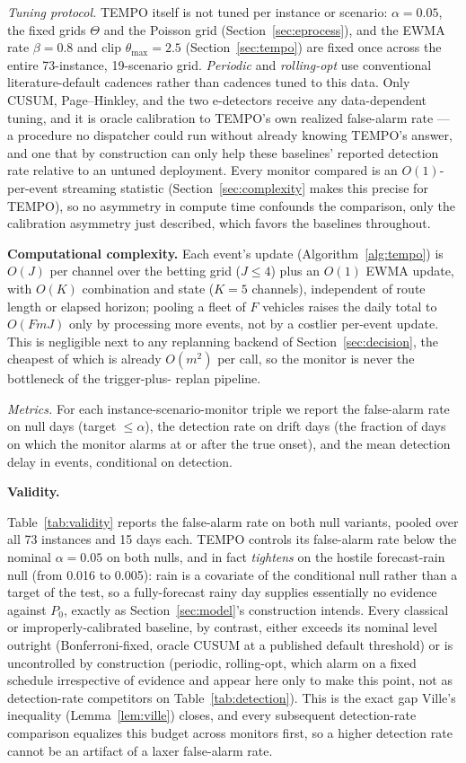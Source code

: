 \documentclass[trsc,dblanonrev]{informs4}
\begin{document}
\emph{Tuning protocol.} TEMPO itself is not tuned per instance or
scenario: $\alpha = 0.05$, the fixed grids $\Theta$ and the Poisson
grid (Section~\ref{sec:eprocess}), and the EWMA rate $\beta = 0.8$ and
clip $\theta_{\max} = 2.5$ (Section~\ref{sec:tempo}) are fixed once
across the entire 73-instance, 19-scenario grid. \emph{Periodic} and
\emph{rolling-opt} use conventional literature-default cadences rather
than cadences tuned to this data. Only CUSUM, Page--Hinkley, and the
two e-detectors receive any data-dependent tuning, and it is oracle
calibration to TEMPO's own realized false-alarm rate --- a procedure no
dispatcher could run without already knowing TEMPO's answer, and one
that by construction can only help these baselines' reported detection
rate relative to an untuned deployment. Every monitor compared is an
$O(1)$-per-event streaming statistic (Section~\ref{sec:complexity}
makes this precise for TEMPO), so no asymmetry in compute time
confounds the comparison, only the calibration asymmetry just
described, which favors the baselines throughout.

\textbf{Computational complexity.}\label{sec:complexity} Each event's
update (Algorithm~\ref{alg:tempo}) is $O(J)$ per channel over the
betting grid ($J \le 4$) plus an $O(1)$ EWMA update, with $O(K)$
combination and state ($K=5$ channels), independent of route length or
elapsed horizon; pooling a fleet of $F$ vehicles raises the daily total
to $O(FmJ)$ only by processing more events, not by a costlier
per-event update. This is negligible next to any replanning backend of
Section~\ref{sec:decision}, the cheapest of which is already $O(m^2)$
per call, so the monitor is never the bottleneck of the trigger-plus-
replan pipeline.

\emph{Metrics.} For each instance-scenario-monitor triple we report the
false-alarm rate on null days (target $\le \alpha$), the detection
rate on drift days (the fraction of days on which the monitor alarms
at or after the true onset), and the mean detection delay in events,
conditional on detection.

\textbf{Validity.}

Table~\ref{tab:validity} reports the false-alarm rate on both null
variants, pooled over all 73 instances and 15 days each. TEMPO controls
its false-alarm rate below the nominal $\alpha = 0.05$ on both nulls,
and in fact \emph{tightens} on the hostile forecast-rain null (from
0.016 to 0.005): rain is a covariate of the conditional null rather
than a target of the test, so a fully-forecast rainy day supplies
essentially no evidence against $P_0$, exactly as
Section~\ref{sec:model}'s construction intends. Every classical or
improperly-calibrated baseline, by contrast, either exceeds its nominal
level outright (Bonferroni-fixed, oracle CUSUM at a published default
threshold) or is uncontrolled by construction (periodic, rolling-opt,
which alarm on a fixed schedule irrespective of evidence and appear
here only to make this point, not as detection-rate competitors on
Table~\ref{tab:detection}). This is the exact gap Ville's inequality
(Lemma~\ref{lem:ville}) closes, and every subsequent detection-rate
comparison equalizes this budget across monitors first, so a higher
detection rate cannot be an artifact of a laxer false-alarm rate.
\end{document}

